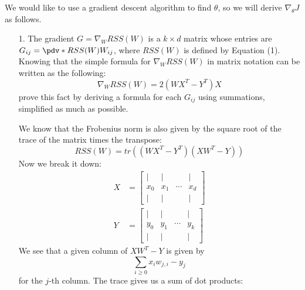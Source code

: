 \documentclass{article}
\begin{document}
We would like to use a gradient descent algorithm to find $\theta$, so we will derive $\nabla_{\theta}J$ as follows.
    \begin{itemize}
        \item [1.] The gradient $G = \nabla_{W}RSS(W)$ is a $k \times d$ matrix whose entries are $G_{ij} = \pdv*{RSS(W)}{W_{ij}}$, where $RSS(W)$ is defined by Equation (1). Knowing that the simple formula for $\nabla_{W}RSS(W)$ in matrix notation can be written as the following:
            \begin{equation*}
                \nabla_{W}RSS(W) = 2(WX^{T} - Y^{T})X
            \end{equation*}
        prove this fact by deriving a formula for each $G_{ij}$ using summations, simplified as much as possible.
            \begin{answer}
                We know that the Frobenius norm is also given by the square root of the trace of the matrix times the transpose:
                    \begin{equation*}
                        RSS(W) = tr((WX^{T} - Y^{T})(XW^{T} - Y))
                    \end{equation*}
                Now we break it down:
                    \begin{align*}
                        X &= \begin{bmatrix}
                            \mid & \mid &        & \mid \\
                            x_{0} & x_{1} & \cdots & x_{d} \\
                            \mid & \mid &        & \mid   
                        \end{bmatrix} \\
                        Y &= \begin{bmatrix}
                            \mid  & \mid  &        & \mid  \\
                            y_{0} & y_{1} & \cdots & y_{k} \\
                            \mid  & \mid  &        & \mid    
                        \end{bmatrix}   
                    \end{align*}
                We see that a given column of $XW^{T} - Y$ is given by
                    \begin{equation*}
                        \sum_{i \geq 0}x_{i} w_{j, i} - y_{j}
                    \end{equation*}
                for the $j$-th column. The trace gives us a sum of dot products:

\end{answer}
\end{itemize}
\end{document}
